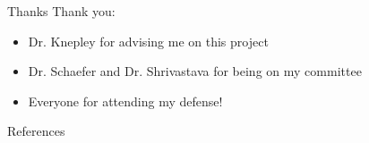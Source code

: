 \documentclass[xcolor=dvipsnames,10pt]{beamer}
\begin{document}
\begin{frame}{Thanks}
\Large
Thank you:
\vspace{.15in}
\begin{itemize}
\item Dr. Knepley for advising me on this project
\vspace{.15in}
\item Dr. Schaefer and Dr. Shrivastava for being on my committee
\vspace{.15in}
\item Everyone for attending my defense!
\end{itemize}
\normalsize
\end{frame}
\begin{frame}{References}
\tiny


\end{frame}
\end{document}
